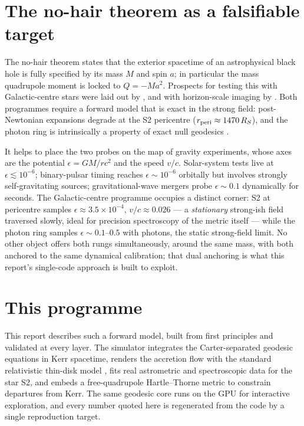\section{The no-hair theorem as a falsifiable target}
\label{sec:nohairintro}

The no-hair theorem states that the exterior spacetime of an astrophysical
black hole is fully specified by its mass $M$ and spin $a$; in particular
the mass quadrupole moment is locked to $Q = -M a^2$. Prospects for testing
this with Galactic-centre stars were laid out by \citet{Will2008}, and with
horizon-scale imaging by \citet{Psaltis2016}. Both programmes require a
forward model that is exact in the strong field: post-Newtonian expansions
degrade at the S2 pericentre ($r_{\rm peri} \approx 1470\,R_S$), and the
photon ring is intrinsically a property of exact null geodesics
\citep{Bardeen1973,Johnson2020}.

It helps to place the two probes on the map of gravity experiments,
whose axes are the potential $\epsilon = GM/rc^2$ and the speed $v/c$.
Solar-system tests live at $\epsilon \lesssim 10^{-6}$; binary-pulsar
timing reaches $\epsilon \sim 10^{-6}$ orbitally but involves strongly
self-gravitating sources; gravitational-wave mergers probe
$\epsilon \sim 0.1$ dynamically for seconds. The Galactic-centre
programme occupies a distinct corner: S2 at pericentre samples
$\epsilon \approx 3.5\times10^{-4}$, $v/c \approx 0.026$ — a
\emph{stationary} strong-ish field traversed slowly, ideal for
precision spectroscopy of the metric itself — while the photon ring
samples $\epsilon \sim 0.1$--$0.5$ with photons, the static
strong-field limit. No other object offers both rungs simultaneously,
around the same mass, with both anchored to the same dynamical
calibration; that dual anchoring is what this report's single-code
approach is built to exploit.

\section{This programme}
\label{sec:programme}

This report describes such a forward model, built from first principles and
validated at every layer. The simulator integrates the Carter-separated
geodesic equations \citep{Carter1968} in Kerr spacetime, renders the
accretion flow with the standard relativistic thin-disk model
\citep{NovikovThorne1973,PageThorne1974}, fits real astrometric and
spectroscopic data for the star S2, and embeds a free-quadrupole
Hartle--Thorne metric \citep{HartleThorne1968,GlampedakisBabak2006} to
constrain departures from Kerr. The same geodesic core runs on the GPU for
interactive exploration, and every number quoted here is regenerated from
the code by a single reproduction target.

